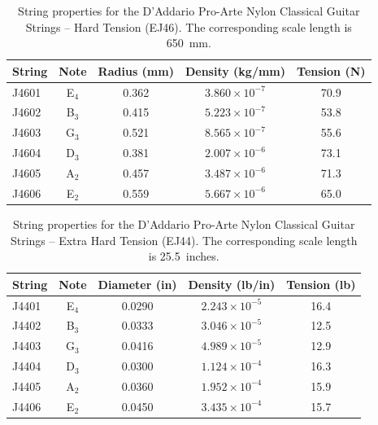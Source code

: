 \begin{table}[htbp]
  \centering
  \caption{\label{tbl:ej46_mks} String properties for the D'Addario Pro-Arte Nylon Classical Guitar Strings -- Hard Tension (EJ46). The corresponding scale length is 650~mm.}
    \begin{tabular}{lcccc}
    \hline \hline
    String  & Note  & \multicolumn{1}{l}{Radius (mm)} & \multicolumn{1}{l}{Density (kg/mm)} & \multicolumn{1}{l}{Tension (N)} \\
    \hline
    J4601 & E$_4$  & 0.362 & $3.860 \times 10^{-7}$ & 70.9 \\
    J4602 & B$_3$  & 0.415 & $5.223 \times 10^{-7}$ & 53.8 \\
    J4603 & G$_3$  & 0.521 & $8.565 \times 10^{-7}$ & 55.6 \\
    J4604 & D$_3$  & 0.381 & $2.007 \times 10^{-6}$ & 73.1 \\
    J4605 & A$_2$  & 0.457 & $3.487 \times 10^{-6}$ & 71.3 \\
    J4606 & E$_2$  & 0.559 & $5.667 \times 10^{-6}$ & 65.0 \\
    \hline
    \end{tabular}%
  \label{tab:addlabel}%
\end{table}%

\begin{table}[htbp]
  \centering
  \caption{\label{tbl:ej44_ips} String properties for the D'Addario Pro-Arte Nylon Classical Guitar Strings -- Extra Hard Tension (EJ44). The corresponding scale length is 25.5~inches.}
    \begin{tabular}{lcccc}
    \hline \hline
    String  & Note  & \multicolumn{1}{l}{Diameter (in)} & \multicolumn{1}{l}{Density (lb/in)} & \multicolumn{1}{l}{Tension (lb)} \\
    \hline
    J4401 & E$_4$  & 0.0290 & $2.243 \times 10^{-5}$ & 16.4 \\
    J4402 & B$_3$  & 0.0333 & $3.046 \times 10^{-5}$ & 12.5 \\
    J4403 & G$_3$  & 0.0416 & $4.989 \times 10^{-5}$ & 12.9 \\
    J4404 & D$_3$  & 0.0300 & $1.124 \times 10^{-4}$ & 16.3 \\
    J4405 & A$_2$  & 0.0360 & $1.952 \times 10^{-4}$ & 15.9 \\
    J4406 & E$_2$  & 0.0450 & $3.435 \times 10^{-4}$ & 15.7 \\
    \hline
    \end{tabular}%
  \label{tab:addlabel}%
\end{table}%

